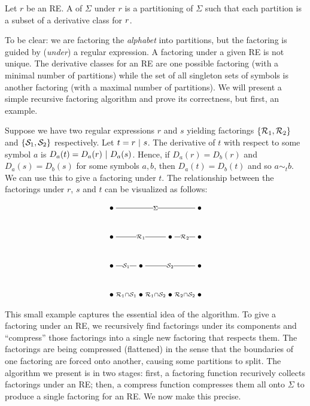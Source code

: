 \begin{definition}
Let $r$ be an RE.  A  of $\Sigma$ under $r$ is a partitioning of $\Sigma$ such that each partition is a subset of a derivative class for $r$.
\end{definition}

To be clear: we are factoring the \emph{alphabet} into partitions, but the factoring is guided by (\emph{under}) a regular expression.  A factoring under a given RE is not unique.  The derivative classes for an RE are one possible factoring (with a minimal number of partitions) while the set of all singleton sets of symbols is another factoring (with a maximal number of partitions).  We will present a simple recursive factoring algorithm and prove its correctness, but first, an example.

Suppose we have two regular expressions $r$ and $s$ yielding factorings $\{ \mathcal{R}_1, \mathcal{R}_2 \}$ and $\{ \mathcal{S}_1, \mathcal{S}_2 \}$ respectively.  Let $t = r \ | \  s$.  The derivative of $t$ with respect to some symbol $a$ is $D_a(t) = D_a(r) \ | \  D_a(s)$.  Hence, if $D_a(r) = D_b(r)$ and $D_a(s) = D_b(s)$ for some symbols $a, b$, then $D_a(t) = D_b(t)$ and so $a \sim_t b$.  We can use this to give a factoring under $t$.  The relationship between the factorings under $r$, $s$ and $t$ can be visualized as follows:

\[
  \xymatrix{
    \bullet \ar@{-}[rrr]|{\Sigma} &&& \bullet \\
    \bullet \ar@{-}[rr]|{\CR_1} && \bullet \ar@{-}[r]|{\CR_2} & \bullet \\
    \bullet \ar@{-}[r]|{\CS_1} & \bullet \ar@{-}[rr]|{\CS_2} &&  \bullet \\
    \bullet \ar@{-}[r]|{\CR_1 \cap \CS_1} & 
    \bullet \ar@{-}[r]|{\CR_1 \cap \CS_2} & 
    \bullet \ar@{-}[r]|{\CR_2 \cap \CS_2} &
    \bullet
  }
\]

This small example captures the essential idea of the algorithm.  To give a factoring under an RE, we recursively find factorings under its components and ``compress'' those factorings into a single new factoring that respects them.  The factorings are being compressed (flattened) in the sense that the boundaries of one factoring are forced onto another, causing some partitions to split.  The algorithm we present is in two stages: first, a factoring function recurively collects factorings under an RE; then, a compress function compresses them all onto $\Sigma$ to produce a single factoring for an RE.  We now make this precise.

